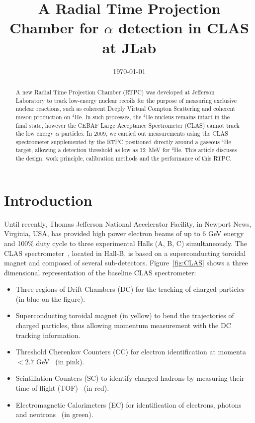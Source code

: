 \documentclass[preprint,5p]{elsarticle}
\begin{document}
\title{\vspace{-15mm}\fontsize{24pt}{10pt}\selectfont\textbf{A Radial Time 
Projection Chamber for $\alpha$ detection in CLAS at JLab}}
  

\date{\today}

\begin{abstract}
A new Radial Time Projection Chamber (RTPC) was developed at Jefferson 
Laboratory to track low-energy nuclear recoils for the purpose of measuring
exclusive nuclear reactions, such as coherent Deeply Virtual Compton Scattering
and coherent meson production on $^4$He. In such processes, the $^4$He nucleus
remains intact in the final state, however the CEBAF Large
Acceptance Spectrometer (CLAS) cannot track the low energy $\alpha$ particles. In
2009, we carried out measurements using the CLAS spectrometer supplemented by
the RTPC positioned directly around a gaseous $^4$He target, allowing a detection
threshold as low as 12~MeV for $^4$He. This article discuses the design,
work principle, calibration methods and the performance of this RTPC.
\end{abstract}

\maketitle

\section{Introduction} \label{sec:level1}

Until recently, Thomas Jefferson National Accelerator Facility, in 
Newport News, Virginia, USA, has provided high power electron beams of 
up to 6 GeV energy and 100$\%$ duty cycle to three experimental Halls (A, B, C) 
simultaneously. The CLAS spectrometer~\cite{CLASref}, located
in Hall-B, is based on a superconducting toroidal magnet and composed of 
several sub-detectors. Figure~\ref{fig:CLAS} shows a three dimensional 
representation of the baseline CLAS spectrometer:
\begin{itemize}
 \item Three regions of Drift Chambers (DC) for the tracking of charged 
       particles~\cite{DCref} (in blue on the figure).
 \item Superconducting toroidal magnet (in yellow) to bend the trajectories 
       of charged particles, thus allowing momentum measurement with the DC tracking information.
 \item Threshold Cherenkov Counters (CC) for electron identification at momenta 
       $<2.7$ GeV~\cite{CCref} (in pink).
 \item Scintillation Counters (SC) to identify charged hadrons by measuring their 
       time of flight (TOF)~\cite{TOFref} (in red).
 \item Electromagnetic Calorimeters (EC) for identification of electrons, 
       photons and neutrons~\cite{ECref} (in green).
\end{itemize}
\end{document}
